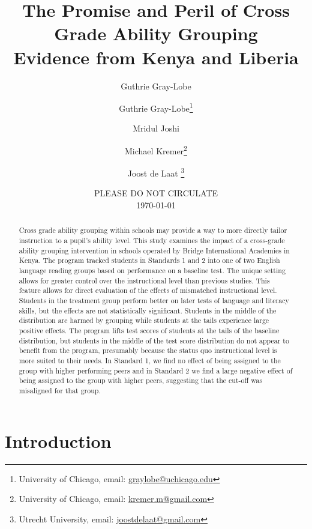 \documentclass[10pt]{article}
\title{The Promise and Peril of Cross Grade Ability Grouping \\ Evidence from Kenya and Liberia}
\author{Guthrie Gray-Lobe}
\date{}
\begin{document}
\begin{titlepage}
\author{Guthrie Gray-Lobe\footnote{University of Chicago, email: \protect\href{mailto:graylobe@uchicago.edu }{graylobe@uchicago.edu}} \and Mridul Joshi \and Michael Kremer\footnote{University of Chicago, email: \protect\href{mailto:kremer.m@gmail.com}{kremer.m@gmail.com}} \and Joost de Laat \footnote{Utrecht University, email: \protect\href{mailto: joostdelaat@gmail.com}{joostdelaat@gmail.com}}}

\date{PLEASE DO NOT CIRCULATE \\ \today \\}
\maketitle

\begin{abstract}
Cross grade ability grouping within schools may provide a way to more directly tailor instruction to a pupil's ability level. This study examines the impact of a cross-grade ability grouping intervention in schools operated by Bridge International Academies in Kenya. The program tracked students in Standards 1 and 2 into one of two English language reading groups based on performance on a baseline test. The unique setting allows for greater control over the instructional level than previous studies. This feature allows for direct evaluation of the effects of mismatched instructional level. Students in the treatment group perform better on later tests of language and literacy skills, but the effects are not statistically significant. Students in the middle of the distribution are harmed by grouping while students at the tails experience large positive effects. The program lifts test scores of students at the tails of the baseline distribution, but students in the middle of the test score distribution do not appear to benefit from the program, presumably because the status quo instructional level is more suited to their needs. In Standard 1, we find no effect of being assigned to the group with higher performing peers and in Standard 2 we find a large negative effect of being assigned to the group with higher peers, suggesting that the cut-off was misaligned for that group.
\end{abstract}
\setcounter{page}{0}
\thispagestyle{empty}
\end{titlepage}
\doublespacing

\section{Introduction}
\end{document}

